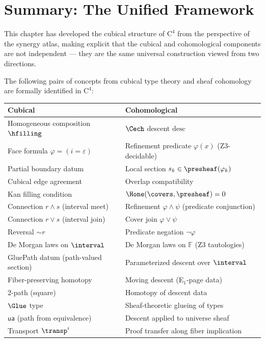 \section{Summary: The Unified Framework}
\label{sec:c4-cubical-summary}

This chapter has developed the cubical structure of $\mathrm{C}^4$ from the
perspective of the synergy atlas, making explicit that the cubical and
cohomological components are not independent --- they are the same universal
construction viewed from two directions.

\begin{theorem}
\label{thm:summary-identifications}
The following pairs of concepts from cubical type theory and sheaf
cohomology are formally identified in $\mathrm{C}^4$:
\begin{center}
\begin{tabular}{p{5.5cm}p{5.5cm}}
\toprule
\textbf{Cubical} & \textbf{Cohomological} \\
\midrule
Homogeneous composition $\hfilling$ &
  $\Cech$ descent $\mathrm{desc}$ \\
Face formula $\varphi = (i = \varepsilon)$ &
  Refinement predicate $\varphi(x)$ (Z3-decidable) \\
Partial boundary datum &
  Local section $s_k \in \presheaf(\varphi_k)$ \\
Cubical edge agreement &
  Overlap compatibility \\
Kan filling condition &
  $\Hone(\covers, \presheaf) = 0$ \\
Connection $r \wedge s$ (interval meet) &
  Refinement $\varphi \wedge \psi$ (predicate conjunction) \\
Connection $r \vee s$ (interval join) &
  Cover join $\varphi \vee \psi$ \\
Reversal $\sim r$ &
  Predicate negation $\neg\varphi$ \\
De Morgan laws on $\interval$ &
  De Morgan laws on $\mathbb{F}$ (Z3 tautologies) \\
GluePath datum (path-valued section) &
  Parameterized descent over $\interval$ \\
Fiber-preserving homotopy &
  Moving descent (E$_1$-page data) \\
2-path (square) &
  Homotopy of descent data \\
$\Glue$ type &
  Sheaf-theoretic glueing of types \\
$\mathsf{ua}$ (path from equivalence) &
  Descent applied to universe sheaf \\
Transport $\transp^i$ &
  Proof transfer along fiber implication \\
\bottomrule
\end{tabular}
\end{center}
\end{theorem}

